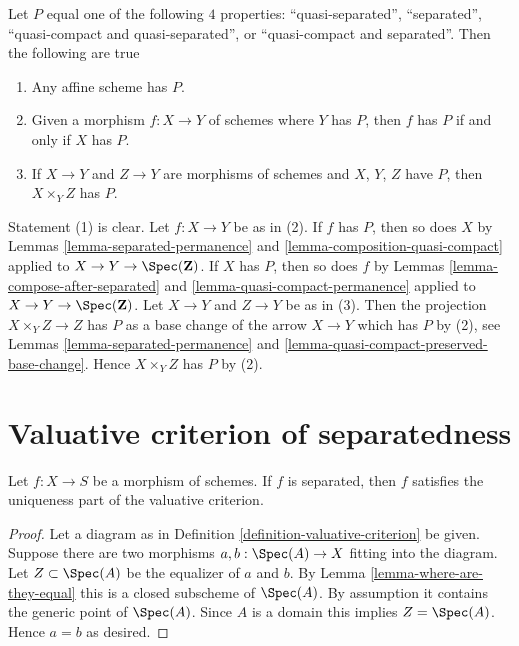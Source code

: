 \begin{remark}
\label{remark-quasi-compact-and-quasi-separated}
Let $P$ equal one of the following $4$ properties:
``quasi-separated'', ``separated'',
``quasi-compact and quasi-separated'', or ``quasi-compact and separated''.
Then the following are true
\begin{enumerate}
\item Any affine scheme has $P$.
\item Given a morphism $f : X \to Y$ of schemes where $Y$ has $P$, then
$f$ has $P$ if and only if $X$ has $P$.
\item If  $X \to Y$ and $Z \to Y$ are morphisms of schemes
and $X$, $Y$, $Z$ have $P$, then $X \times_Y Z$ has $P$.
\end{enumerate}
Statement (1) is clear.
Let $f : X \to Y$ be as in (2). If $f$ has $P$, then so does $X$
by Lemmas \ref{lemma-separated-permanence} and
\ref{lemma-composition-quasi-compact} applied to
$X \to Y \to \Spec(\mathbf{Z})$. If $X$ has $P$, then so does $f$ by
Lemmas \ref{lemma-compose-after-separated} and
\ref{lemma-quasi-compact-permanence} applied to
$X \to Y \to \Spec(\mathbf{Z})$.
Let $X \to Y$ and $Z \to Y$ be as in (3).
Then the projection $X \times_Y Z \to Z$ has $P$ as a base change of
the arrow $X \to Y$ which has $P$ by (2), see Lemmas
\ref{lemma-separated-permanence} and
\ref{lemma-quasi-compact-preserved-base-change}.
Hence $X \times_Y Z$ has $P$ by (2).
\end{remark}





\section{Valuative criterion of separatedness}
\label{section-valuative-separatedness}

\begin{lemma}
\label{lemma-separated-implies-valuative}
Let $f : X \to S$ be a morphism of schemes.
If $f$ is separated, then $f$ satisfies the uniqueness
part of the valuative criterion.
\end{lemma}

\begin{proof}
Let a diagram as in Definition \ref{definition-valuative-criterion}
be given. Suppose there are two morphisms
$a, b : \Spec(A) \to X$ fitting into the diagram.
Let $Z \subset \Spec(A)$ be the equalizer of $a$ and $b$.
By Lemma \ref{lemma-where-are-they-equal} this is a closed
subscheme of $\Spec(A)$. By assumption it contains
the generic point of $\Spec(A)$. Since $A$ is a domain
this implies $Z = \Spec(A)$. Hence $a = b$ as desired.
\end{proof}

